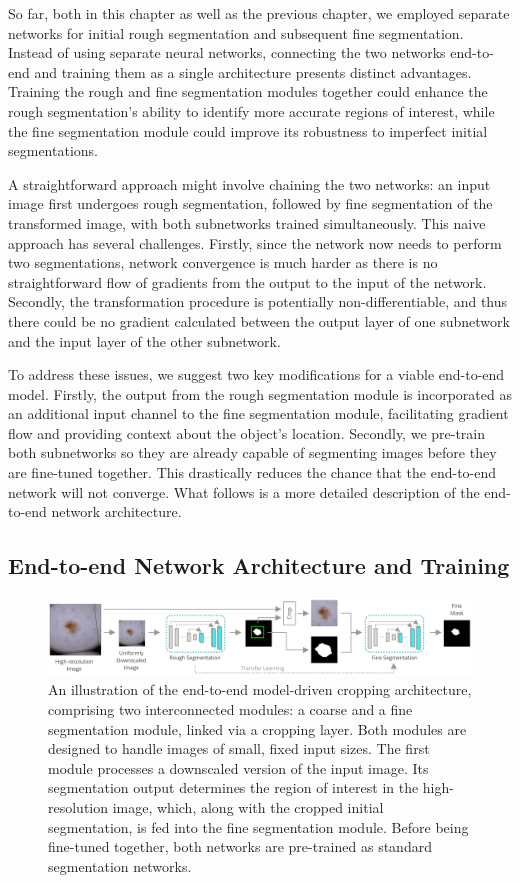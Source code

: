 So far, both in this chapter as well as the previous chapter, we employed separate networks for initial rough segmentation and subsequent fine segmentation. Instead of using separate neural networks, connecting the two networks end-to-end and training them as a single architecture presents distinct advantages. Training the rough and fine segmentation modules together could enhance the rough segmentation's ability to identify more accurate regions of interest, while the fine segmentation module could improve its robustness to imperfect initial segmentations.

A straightforward approach might involve chaining the two networks: an input image first undergoes rough segmentation, followed by fine segmentation of the transformed image, with both subnetworks trained simultaneously. This naive approach has several challenges. Firstly, since the network now needs to perform two segmentations, network convergence is much harder as there is no straightforward flow of gradients from the output to the input of the network. Secondly, the transformation procedure is potentially non-differentiable, and thus there could be no gradient calculated between the output layer of one subnetwork and the input layer of the other subnetwork.

To address these issues, we suggest two key modifications for a viable end-to-end model. Firstly, the output from the rough segmentation module is incorporated as an additional input channel to the fine segmentation module, facilitating gradient flow and providing context about the object's location. Secondly, we pre-train both subnetworks so they are already capable of segmenting images before they are fine-tuned together. This drastically reduces the chance that the end-to-end network will not converge. What follows is a more detailed description of the end-to-end network architecture.

\subsection{End-to-end Network Architecture and Training}

\begin{figure}[b!]
\includegraphics[width=\textwidth]{images/5/e2e/diagram.pdf}
\caption{An illustration of the end-to-end model-driven cropping architecture, comprising two interconnected modules: a coarse and a fine segmentation module, linked via a cropping layer. Both modules are designed to handle images of small, fixed input sizes. The first module processes a downscaled version of the input image. Its segmentation output determines the region of interest in the high-resolution image, which, along with the cropped initial segmentation, is fed into the fine segmentation module. Before being fine-tuned together, both networks are pre-trained as standard segmentation networks.\label{fig:e2e-diagram}}\end{figure}

